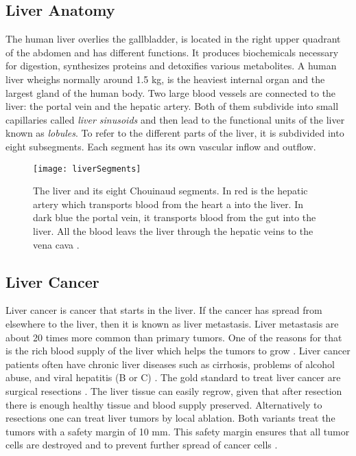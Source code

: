 \subsection{Liver Anatomy}
The human liver overlies the gallbladder, is located in the right upper quadrant of the abdomen and has
different functions. It produces biochemicals necessary for digestion,
synthesizes proteins and detoxifies various metabolites. A human liver wheighs
normally around 1.5 kg, is the heaviest internal organ and the largest gland
of the human body. Two large blood vessels are connected to the liver: the
portal vein and the hepatic artery. Both of them subdivide into small
capillaries called \textit{liver sinusoids} and then lead to the functional
units of the liver known as \textit{lobules}. To refer to the different parts of
the liver, it is subdivided into eight subsegments. Each segment has its own
vascular inflow and outflow.
\begin{figure}[H]
  \centering
 \texttt{[image: liverSegments]}
  \caption{The liver and its eight Chouinaud segments. In red is the hepatic
    artery which transports blood from the heart a into the liver. In dark blue
    the portal vein, it transports blood from the gut into the liver. All the
    blood leavs the liver through the hepatic veins to the vena cava \cite{siriwardena2014management}.}
  \label{fig:liverSegments}
\end{figure}

\subsection{Liver Cancer}
Liver cancer is cancer that starts in the liver. If the cancer has spread from
elsewhere to the liver, then it is known as liver metastasis. Liver metastasis
are about 20 times more common than primary tumors. One of the reasons for that
is the rich blood supply of the liver which helps the tumors to grow
\cite{mcguire2016world}. Liver cancer patients often have chronic liver diseases
such as cirrhosis, problems of alcohol abuse, and viral hepatitis (B or C)
\cite{galun2015hepatocellular}. The gold standard to treat liver cancer are
surgical resections \cite{lencioni2012local}. The liver tissue can easily regrow, given that after resection there is
enough healthy tissue and blood supply preserved. Alternatively to resections
one can treat liver tumors by local ablation. Both variants treat the tumors
with a safety margin of 10 mm. This safety margin ensures that all tumor cells
are destroyed and to prevent further spread of cancer cells \cite{mahnken2009ct}.
